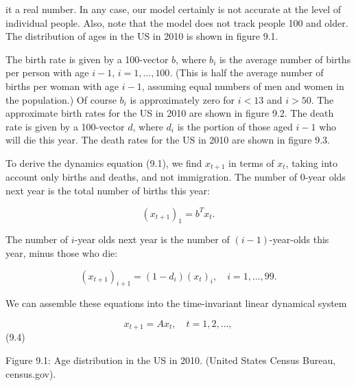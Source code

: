 it a real number. In any case, our model certainly is not accurate at the level of individual people. Also, note that the model does not track people 100 and older. The distribution of ages in the US in 2010 is shown in figure 9.1.

The birth rate is given by a 100-vector \(b\), where \(b_{i}\) is the average number of births per person with age \(i-1\), \(i=1,\ldots,100\). (This is half the average number of births per woman with age \(i-1\), assuming equal numbers of men and women in the population.) Of course \(b_{i}\) is approximately zero for \(i<13\) and \(i>50\). The approximate birth rates for the US in 2010 are shown in figure 9.2. The death rate is given by a 100-vector \(d\), where \(d_{i}\) is the portion of those aged \(i-1\) who will die this year. The death rates for the US in 2010 are shown in figure 9.3.

To derive the dynamics equation (9.1), we find \(x_{t+1}\) in terms of \(x_{t}\), taking into account only births and deaths, and not immigration. The number of 0-year olds next year is the total number of births this year:

\[(x_{t+1})_{1}=b^{T}x_{t}.\]

The number of \(i\)-year olds next year is the number of \((i-1)\)-year-olds this year, minus those who die:

\[(x_{t+1})_{i+1}=(1-d_{i})(x_{t})_{i},\quad i=1,\ldots,99.\]

We can assemble these equations into the time-invariant linear dynamical system

\[x_{t+1}=Ax_{t},\quad t=1,2,\ldots,\] (9.4)

Figure 9.1: Age distribution in the US in 2010. (United States Census Bureau, census.gov).

 